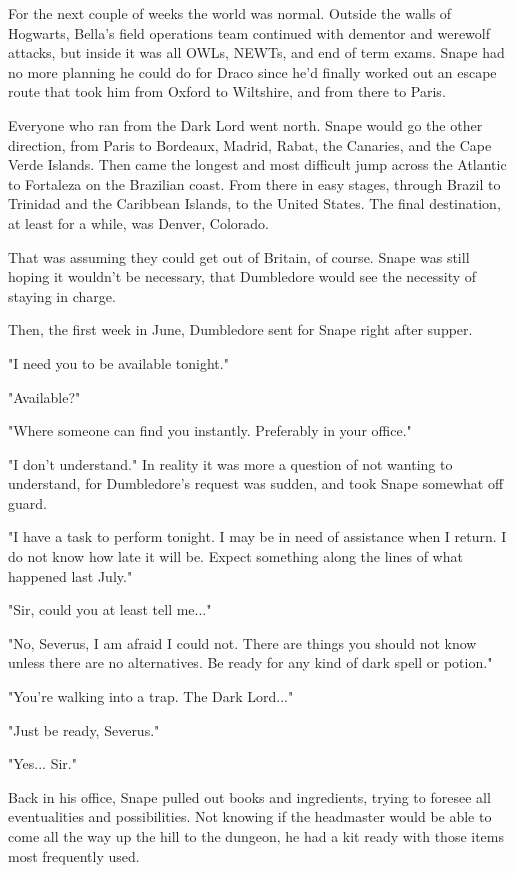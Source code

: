 \documentclass[a4paper,11pt]{article}
\begin{document}
For the next couple of weeks the world was normal. Outside the walls of Hogwarts, Bella's field operations team continued with dementor and werewolf attacks, but inside it was all OWLs, NEWTs, and end of term exams. Snape had no more planning he could do for Draco since he'd finally worked out an escape route that took him from Oxford to Wiltshire, and from there to Paris.

Everyone who ran from the Dark Lord went north. Snape would go the other direction, from Paris to Bordeaux, Madrid, Rabat, the Canaries, and the Cape Verde Islands. Then came the longest and most difficult jump across the Atlantic to Fortaleza on the Brazilian coast. From there in easy stages, through Brazil to Trinidad and the Caribbean Islands, to the United States. The final destination, at least for a while, was Denver, Colorado.

That was assuming they could get out of Britain, of course. Snape was still hoping it wouldn't be necessary, that Dumbledore would see the necessity of staying in charge.

Then, the first week in June, Dumbledore sent for Snape right after supper.

"I need you to be available tonight."

"Available?"

"Where someone can find you instantly. Preferably in your office."

"I don't understand." In reality it was more a question of not wanting to understand, for Dumbledore's request was sudden, and took Snape somewhat off guard.

"I have a task to perform tonight. I may be in need of assistance when I return. I do not know how late it will be. Expect something along the lines of what happened last July."

"Sir, could you at least tell me..."

"No, Severus, I am afraid I could not. There are things you should not know unless there are no alternatives. Be ready for any kind of dark spell or potion."

"You're walking into a trap. The Dark Lord..."

"Just be ready, Severus."

"Yes... Sir."

Back in his office, Snape pulled out books and ingredients, trying to foresee all eventualities and possibilities. Not knowing if the headmaster would be able to come all the way up the hill to the dungeon, he had a kit ready with those items most frequently used.
\end{document}
